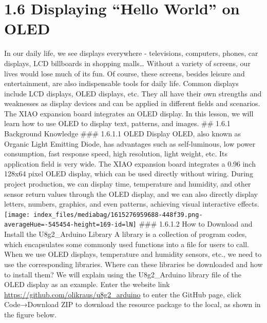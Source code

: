 \documentclass[
  letterpaper,
  DIV=11,
  numbers=noendperiod]{scrreprt}
\begin{document}

\hypertarget{displaying-hello-world-on-oled}{%
\chapter*{1.6 Displaying ``Hello World'' on
OLED}\label{displaying-hello-world-on-oled}}


In our daily life, we see displays everywhere - televisions, computers,
phones, car displays, LCD billboards in shopping malls\ldots{} Without a
variety of screens, our lives would lose much of its fun. Of course,
these screens, besides leisure and entertainment, are also indispensable
tools for daily life. Common displays include LCD displays, OLED
displays, etc. They all have their own strengths and weaknesses as
display devices and can be applied in different fields and scenarios.
The XIAO expansion board integrates an OLED display. In this lesson, we
will learn how to use OLED to display text, patterns, and images. \#\#
1.6.1 Background Knowledge \#\#\# 1.6.1.1 OLED Display OLED, also known
as Organic Light Emitting Diode, has advantages such as self-luminous,
low power consumption, fast response speed, high resolution, light
weight, etc. Its application field is very wide. The XIAO expansion
board integrates a 0.96 inch 128x64 pixel OLED display, which can be
used directly without wiring. During project production, we can display
time, temperature and humidity, and other sensor return values through
the OLED display, and we can also directly display letters, numbers,
graphics, and even patterns, achieving visual interactive effects.
\texttt{[image: index\_files/mediabag/1615276959688-448f39.png-averageHue=-545454-height=169-id=lN]}
\#\#\# 1.6.1.2 How to Download and Install the U8g2\_Arduino Library A
library is a collection of program codes, which encapsulates some
commonly used functions into a file for users to call. When we use OLED
displays, temperature and humidity sensors, etc., we need to use the
corresponding libraries. Where can these libraries be downloaded and how
to install them? We will explain using the U8g2\_Arduino library file of
the OLED display as an example. Enter the website link 🔗
\url{https://github.com/olikraus/u8g2_arduino} to enter the GitHub page,
click Code→Download ZIP to download the resource package to the local,
as shown in the figure below.
\end{document}
